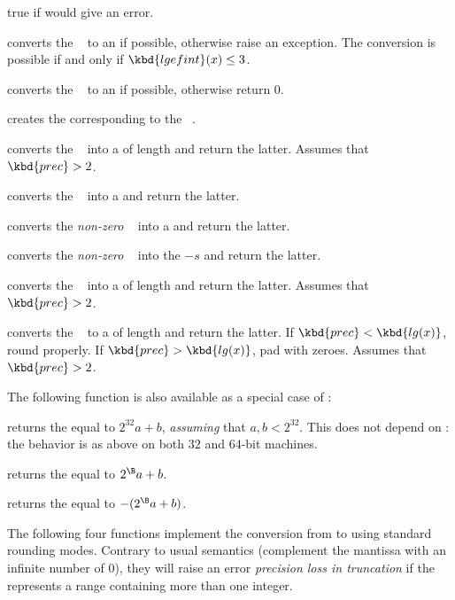  true if  would give an error.

 converts the ~ to an  if
possible, otherwise raise an exception. The conversion is possible if
and only if $\kbd{lgefint}(x) \leq 3$.

 converts the ~ to an
 if possible, otherwise return $0$.

 creates the  corresponding to the
~.

 converts the ~ into a
 of length  and return the latter. Assumes that
$\kbd{prec} > 2$.

 converts the ~ into a 
and return the latter.

 converts the \emph{non-zero} ~
into a  and return the latter.

 converts the \emph{non-zero} ~
into the  $-s$ and return the latter.

 converts the ~ into a
 of length  and return the latter. Assumes that
$\kbd{prec} > 2$.

 converts the ~ to a
 of length  and return the latter. If
$\kbd{prec} < \kbd{lg(x)}$, round properly. If $\kbd{prec} > \kbd{lg(x)}$,
pad with zeroes. Assumes that $\kbd{prec} > 2$.

\noindent The following function is also available as a special case of
:

 returns the  equal to $2^{32} a +
b$, \emph{assuming} that $a,b < 2^{32}$. This does not depend on
: the behavior is as above on both $32$ and $64$-bit
machines.

 returns the  equal to
$2^{\B} a + b$.

 returns the  equal to
$-(2^{\B} a + b)$.

The following four functions implement the conversion from  to
 using standard rounding modes. Contrary to usual semantics
(complement the mantissa with an infinite number of 0), they will raise an
error \emph{precision loss in truncation} if the  represents a
range containing more than one integer.

